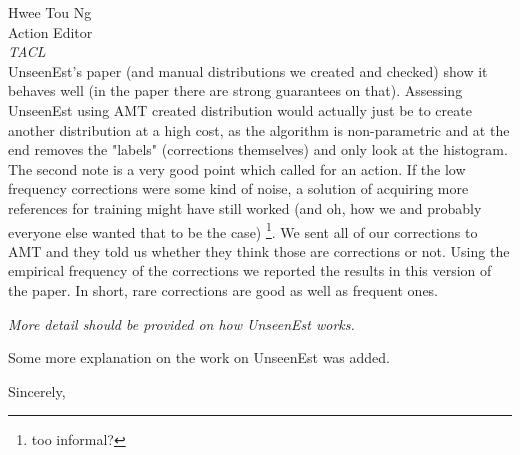 \documentclass[11pt,letterpaper]{letter}
\begin{document}
\begin{letter}{%
Hwee Tou Ng\\
Action Editor\\
{\em TACL}\\
}
		UnseenEst's paper (and manual distributions we created and checked) show it behaves well (in the paper there are strong guarantees on that). Assessing UnseenEst using AMT created distribution would actually just be to create another distribution at a high cost, as the algorithm is non-parametric and at the end removes the "labels" (corrections themselves) and only look at the histogram.
		The second note is a very good point which called for an action. If the low frequency corrections were some kind of noise, a solution of acquiring more references for training might have still worked (and oh, how we and probably everyone else wanted that to be the case) \footnote{too informal?}. We sent all of our corrections to AMT and they told us whether they think those are corrections or not. Using the empirical frequency of the corrections we reported the results in this version of the paper. In short, rare corrections are good as well as frequent ones.
		
		\emph{More detail should be provided on how UnseenEst works.}
		
		Some more explanation on the work on UnseenEst was added.
	
\closing{Sincerely,}

\end{letter}
\end{document}
